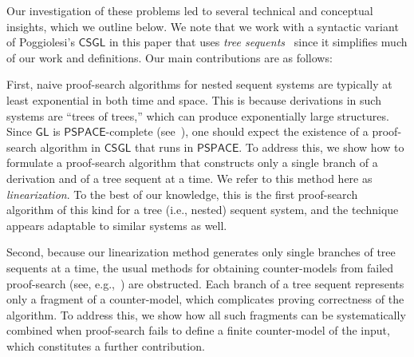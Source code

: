 \documentclass[copyright,creativecommons]{eptcs}
\newcommand{\logicgl}{\mathsf{GL}}
\renewcommand{\phi}{\varphi}
\newcommand{\calc}{\mathsf{CSGL}}
\newcommand{\pspace}{\mathsf{PSPACE}}
\begin{document}
Our investigation of these problems led to several technical and conceptual insights, which we outline below. We note that we work with a syntactic variant of Poggiolesi's $\calc$ in this paper that uses \emph{tree sequents}~\cite{IshKik07} since it simplifies much of our work and definitions. Our main contributions are as follows:
\begin{description}[leftmargin=!, labelwidth=1em, labelsep=.5em]

\item[$\bullet$] First, naive proof-search algorithms for nested sequent systems are typically at least exponential in both time and space. This is because derivations in such systems are ``trees of trees,'' which can produce exponentially large structures. Since $\logicgl$ is $\pspace$-complete (see~\cite[Lemma 18.26]{ChaZak97}), one should expect the existence of a proof-search algorithm in $\calc$ that runs in $\pspace$. To address this, we show how to formulate a proof-search algorithm that constructs only a single branch of a derivation and of a tree sequent at a time. We refer to this method here as \emph{linearization}. To the best of our knowledge, this is the first proof-search algorithm of this kind for a tree (i.e., nested) sequent system, and the technique appears adaptable to similar systems as well. 

\item[$\bullet$] Second, because our linearization method generates only single branches of tree sequents at a time, the usual methods for obtaining counter-models from failed proof-search (see, e.g.,~\cite{LyoGom22,TiuIanGor12}) are obstructed. Each branch of a tree sequent represents only a fragment of a counter-model, which complicates proving correctness of the algorithm. To address this, we show how all such fragments can be systematically combined when proof-search fails to define a finite counter-model of the input, which constitutes a further contribution.



\end{description}
\end{document}
